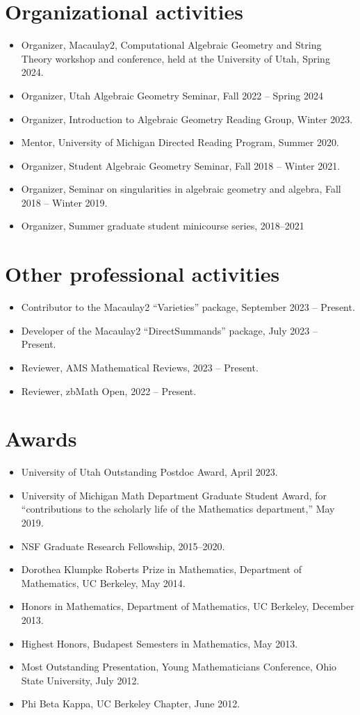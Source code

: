 \documentclass{res}
\begin{document}
\begin{resume}
\section{Organizational activities}
\begin{itemize}
\item Organizer, Macaulay2, Computational Algebraic Geometry and String Theory workshop and conference, held at the University of Utah, Spring 2024.
\item Organizer, Utah Algebraic Geometry Seminar, Fall 2022 -- Spring 2024
\item Organizer, Introduction to Algebraic Geometry Reading Group, Winter 2023.
\item Mentor, University of Michigan Directed Reading Program, Summer 2020.
\item Organizer, Student Algebraic Geometry Seminar, Fall 2018 -- Winter 2021.
\item Organizer, Seminar on singularities in algebraic geometry and  algebra, Fall 2018 -- Winter 2019.
\item Organizer, Summer graduate student minicourse series, 2018--2021
\end{itemize}

\section{Other professional activities}
\begin{itemize}
\item Contributor to the Macaulay2 ``Varieties'' package, September 2023 -- Present.
\item Developer of the Macaulay2 ``DirectSummands'' package, July 2023 -- Present.
\item Reviewer, AMS Mathematical Reviews, 2023 -- Present.
\item Reviewer, zbMath Open, 2022 -- Present.
\end{itemize}

\section{Awards}
\begin{itemize}
\item University of Utah Outstanding Postdoc Award, April 2023.
\item University of Michigan Math Department Graduate Student Award, for “contributions to the scholarly life of the Mathematics department,” May 2019.
\item NSF Graduate Research Fellowship, 2015–2020.
\item Dorothea Klumpke Roberts Prize in Mathematics, Department of Mathematics, UC Berkeley, May 2014.
\item Honors in Mathematics, Department of Mathematics, UC Berkeley, December 2013.
\item Highest Honors, Budapest Semesters in Mathematics, May 2013.
\item Most Outstanding Presentation, Young Mathematicians Conference, Ohio State University, July 2012.
\item Phi Beta Kappa, UC Berkeley Chapter, June 2012.
\end{itemize}
\end{resume}
\end{document}
